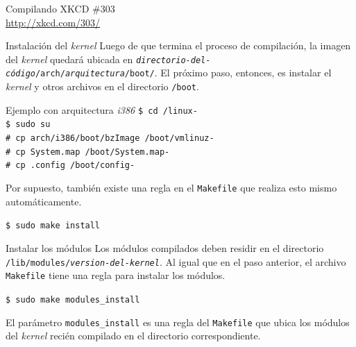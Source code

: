 \begin{frame}{Compilando}
  \large XKCD \#303 \\ \url{http://xkcd.com/303/}
  \begin{center}
   \end{center}
\end{frame}


\begin{frame}{Instalación del \textit{kernel}}
  Luego de que termina el proceso de compilación, la imagen del
  \textit{kernel} quedará ubicada en
  \texttt{\textit{directorio-del-código}/arch/\textit{arquitectura}/boot/}. El
  próximo paso, entonces, es instalar el \textit{kernel} y otros archivos
  en el directorio \texttt{/boot}.

  { \tiny
  \begin{block}{Ejemplo con arquitectura \textit{i386}}
    \texttt{\$ cd \KERNELSOURCEPATH/linux-\KERNELBASEVERSION \\
\$ sudo su \\
\# cp arch/i386/boot/bzImage /boot/vmlinuz-\KERNELBASEVERSION \\
\# cp System.map /boot/System.map-\KERNELBASEVERSION \\
\# cp .config /boot/config-\KERNELBASEVERSION}
  \end{block}}
  \vfill \pause

  Por supuesto, también existe una regla en el \texttt{Makefile} que
  realiza esto mismo automáticamente.
  { \tiny
  \begin{block}{}
    \texttt{\$ sudo make install}
  \end{block}}
\end{frame} 

\begin{frame}{Instalar los módulos}
  Los módulos compilados deben residir en el directorio
  \texttt{/lib/modules/\textit{version-del-kernel}}. Al igual que en el
  paso anterior, el archivo \texttt{Makefile} tiene una regla para instalar
  los módulos.
  \begin{block}{}
    \texttt{\$ sudo make modules\_install}
  \end{block}
  El parámetro \texttt{modules\_install} es una regla del \texttt{Makefile}
  que ubica los módulos del \textit{kernel} recién compilado en el
  directorio correspondiente.
\end{frame}

